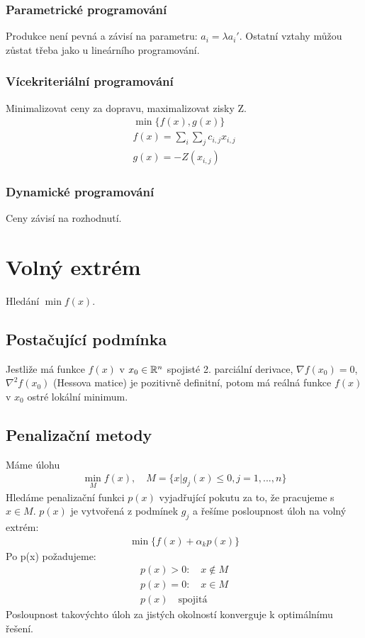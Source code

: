 \documentclass[a4paper,12pt,titlepage]{article}
\begin{document}
\subsubsection{Parametrické programování}
Produkce není pevná a závisí na parametru: $a_i = \lambda a_i'$. Ostatní vztahy
můžou zůstat třeba jako u lineárního programování.
\subsubsection{Vícekriteriální programování}
Minimalizovat ceny za dopravu, maximalizovat zisky Z.
\begin{align}
	\min \{f(x), g(x)\} \\
	f(x) = \sum_i \sum_j c_{i,j} x_{i,j} \\
	g(x) = - Z(x_{i,j}) 
\end{align}
\subsubsection{Dynamické programování}
Ceny závisí na rozhodnutí.


\section{Volný extrém}
\setcounter{equation}{0}
Hledání $\min f(x)$.
\subsection{Postačující podmínka}
\setcounter{equation}{0}
Jestliže má funkce $f(x)$ v $x_0 \in \mathbb{R}^n$ spojisté 2. parciální derivace,
$\nabla f(x_0) = 0$, $\nabla^2 f(x_0)$ (Hessova matice) je pozitivně definitní,
potom má reálná funkce $f(x)$ v $x_0$ ostré lokální minimum.
\subsection{Penalizační metody}
\setcounter{equation}{0}
Máme úlohu
\begin{align}
	\min_M f(x), \quad M = \{ x | g_j(x) \le 0, j = 1, ..., n \}
\end{align}
Hledáme penalizační funkci $p(x)$ vyjadřující pokutu za to, že pracujeme s $x \in
M$. $p(x)$ je vytvořená z podmínek $g_j$ a řešíme posloupnost úloh na volný
extrém:
\begin{align}
	\min \{ f(x) + \alpha_k p(x) \}
\end{align}
Po p(x) požadujeme:
\begin{align}
	p(x) > 0: \quad x \nin M \\
	p(x) = 0: \quad x \in M \\
	p(x) \quad \text{spojitá}
\end{align}
Posloupnost takovýchto úloh za jistých okolností konverguje k optimálnímu řešení.
\end{document}
